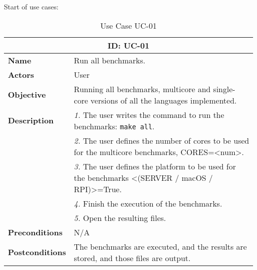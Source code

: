 Start of use cases:
\begin{table}[H]
    \centering
    \begin{tabular}{l p{10cm}}
        \toprule
        \multicolumn{2}{c}{\textbf{ID: UC-01}} \\
        \toprule
        \textbf{Name}                         &  Run all benchmarks. \\
        \textbf{Actors}                       &  User \\
        \textbf{Objective}                    &  Running all benchmarks, multicore and single-core versions of all the languages implemented. \\
        \multirow{1}{*}{\textbf{Description}} & \textsl{1.} The user writes the command to run the benchmarks: \texttt{make all}.\\
                                              & \textsl{2.} The user defines the number of cores to be used for the multicore benchmarks, CORES=<num>.\\
                                              & \textsl{3.} The user defines the platform to be used for the benchmarks <(SERVER / macOS / RPI)>=True.\\
                                              & \textsl{4.} Finish the execution of the benchmarks.\\
                                              & \textsl{5.} Open the resulting files.\\ 
        \textbf{Preconditions}                &  N/A \\
        \textbf{Postconditions}               &  The benchmarks are executed, and the results are stored, and those files are output. \\
    \end{tabular}
    \caption{Use Case UC-01}
    \label{tab:uc-01}
\end{table}

